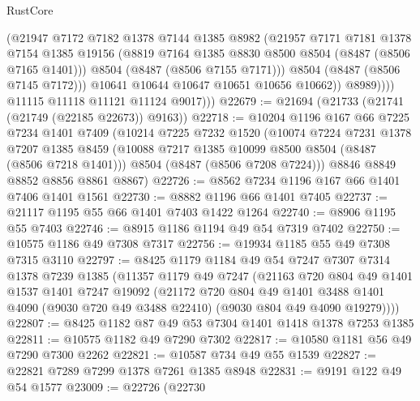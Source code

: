 \begin{lexlean}{RustCore}
\begin{coremodule}
                      (@21947
                        @7172
                        @7182
                        @1378
                        @7144
                        @1385
                        @8982
                        (@21957
                          @7171
                          @7181
                          @1378
                          @7154
                          @1385
                          @19156
                          (@8819 @7164 @1385 @8830 @8500 @8504 (@8487 (@8506 @7165 @1401)))
                          @8504
                          (@8487 (@8506 @7155 @7171)))
                        @8504
                        (@8487 (@8506 @7145 @7172)))
                      @10641
                      @10644
                      @10647
                      @10651
                      @10656
                      @10662))
                  @8989))))
          @11115
          @11118
          @11121
          @11124
          @9017)))
@22679 := @21694 (@21733 (@21741 (@21749 (@22185 @22673)) @9163))
@22718 := @10204
    @1196
    @167
    @66
    @7225
    @7234
    @1401
    @7409
    (@10214
      @7225
      @7232
      @1520
      (@10074
        @7224
        @7231
        @1378
        @7207
        @1385
        @8459
        (@10088 @7217 @1385 @10099 @8500 @8504 (@8487 (@8506 @7218 @1401)))
        @8504
        (@8487 (@8506 @7208 @7224)))
      @8846
      @8849
      @8852
      @8856
      @8861
      @8867)
@22726 := @8562 @7234 @1196 @167 @66 @1401 @7406 @1401 @1561
@22730 := @8882 @1196 @66 @1401 @7405
@22737 := @21117 @1195 @55 @66 @1401 @7403 @1422 @1264
@22740 := @8906 @1195 @55 @7403
@22746 := @8915 @1186 @1194 @49 @54 @7319 @7402
@22750 := @10575 @1186 @49 @7308 @7317
@22756 := @19934 @1185 @55 @49 @7308 @7315 @3110
@22797 := @8425
    @1179
    @1184
    @49
    @54
    @7247
    @7307
    @7314
    @1378
    @7239
    @1385
    (@11357
      @1179
      @49
      @7247
      (@21163
        @720
        @804
        @49
        @1401
        @1537
        @1401
        @7247
        @19092
        (@21172
          @720
          @804
          @49
          @1401
          @3488
          @1401
          @4090
          (@9030 @720 @49 @3488 @22410)
          (@9030 @804 @49 @4090 @19279))))
@22807 := @8425 @1182 @87 @49 @53 @7304 @1401 @1418 @1378 @7253 @1385
@22811 := @10575 @1182 @49 @7290 @7302
@22817 := @10580 @1181 @56 @49 @7290 @7300 @2262
@22821 := @10587 @734 @49 @55 @1539
@22827 := @22821 @7289 @7299 @1378 @7261 @1385 @8948
@22831 := @9191 @122 @49 @54 @1577
@23009 := @22726
    (@22730

\end{coremodule}
\end{lexlean}
